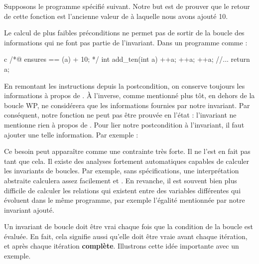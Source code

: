 

Supposons le programme spécifié suivant. Notre but est de prouver que le retour
de cette fonction est l'ancienne valeur de  à laquelle nous avons ajouté 10.






Le calcul de plus faibles préconditions ne permet pas de sortir de la boucle des
informations qui ne font pas partie de l'invariant. Dans un programme comme :



\begin{CodeBlock}{c}
/*@
    ensures \result == \old(a) + 10;
*/
int add_ten(int a){
    ++a;
    ++a;
    ++a;
    //...
    return a;
}
\end{CodeBlock}



En remontant les instructions depuis la postcondition, on conserve toujours les
informations à propos de . À l'inverse, comme mentionné plus tôt, en dehors
de la boucle WP, ne considérera que les informations fournies par notre
invariant. Par conséquent, notre fonction  ne peut pas être prouvée
en l'état : l'invariant ne mentionne rien à propos de . Pour lier notre
postcondition à l'invariant, il faut ajouter une telle information. Par 
exemple :






\begin{Information}
Ce besoin peut apparaître comme une contrainte très forte. Il ne l'est en fait pas
tant que cela. Il existe des analyses fortement automatiques capables de 
calculer les invariants de boucles. Par exemple, sans spécifications, une 
interprétation abstraite calculera assez facilement  et 
. En revanche, il est souvent bien plus difficile
de calculer les relations qui existent entre des variables différentes qui 
évoluent dans le même programme, par exemple l'égalité mentionnée par notre 
invariant ajouté.
\end{Information}




Un invariant de boucle doit être vrai chaque fois que la condition de la boucle est
évaluée. En fait, cela signifie aussi qu'elle doit être vraie avant chaque itération,
et après chaque itération \textbf{complète}. Illustrons cette idée importante avec un
exemple.


